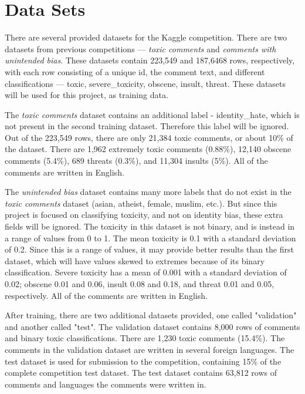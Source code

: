 \documentclass{article}
\begin{document}
\section{Data Sets}

There are several provided datasets for the Kaggle competition. There are two datasets from previous competitions --- \textit{toxic comments} and \textit{comments with unintended bias}. These datasets contain 223,549 and 187,6468 rows, respectively, with each row consisting of a unique id, the comment text, and different classifications --- toxic, severe\_toxicity, obscene, insult, threat. These datasets will be used for this project, as training data.

The \textit{toxic comments} dataset contains an additional label - identity\_hate, which is not present in the second training dataset. Therefore this label will be ignored. Out of the 223,549 rows, there are only 21,384 toxic comments, or about 10\% of the dataset. There are 1,962 extremely toxic comments (0.88\%), 12,140 obscene comments (5.4\%), 689 threats (0.3\%), and 11,304 insults (5\%). All of the comments are written in English.

The \textit{unintended bias} dataset contains many more labels that do not exist in the \textit{toxic comments} dataset (asian, atheist, female, muslim, etc.). But since this project is focused on classifying toxicity, and not on identity bias, these extra fields will be ignored. The toxicity in this dataset is not binary, and is instead in a range of values from 0 to 1. The mean toxicity is 0.1 with a standard deviation of 0.2. Since this is a range of values, it may provide better results than the first dataset, which will have values skewed to extremes because of its binary classification. Severe toxicity has a mean of 0.001 with a standard deviation of 0.02; obscene 0.01 and 0.06, insult 0.08 and 0.18, and threat 0.01 and 0.05, respectively. All of the comments are written in English.

After training, there are two additional datasets provided, one called "validation" and another called "test". The validation dataset contains 8,000 rows of comments and binary toxic classifications. There are 1,230 toxic comments (15.4\%). The comments in the validation dataset are written in several foreign languages. The test dataset is used for submission to the competition, containing 15\% of the complete competition test dataset. The test dataset contains 63,812 rows of comments and languages the comments were written in.
\end{document}
